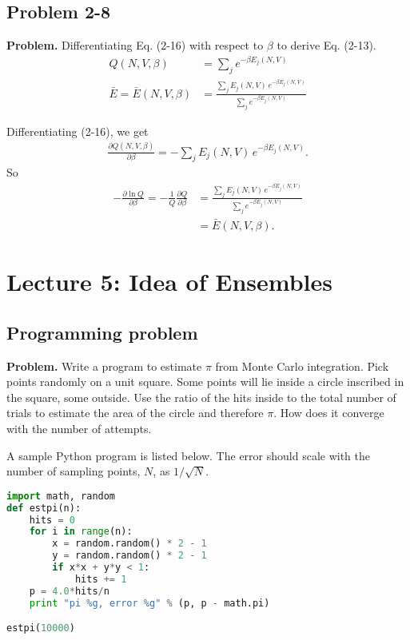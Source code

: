 \documentclass[twocolumn, 10pt]{article}
\numberwithin{equation}{section}
\newenvironment{problem}
{\par\medskip \color{problue}
  \textbf{Problem. }\ignorespaces}
{\medskip}
\newenvironment{solution}[1][\empty]
{\par\medskip\sffamily
  \textbf{\ifx\empty#1{Solution.}\relax\else{#1}\fi} \ignorespaces}
{\medskip}
\begin{document}
\subsection{Problem 2-8}

\begin{problem}
  Differentiating Eq. (2-16) with respect to $\beta$
  to derive Eq. (2-13).
  \begin{align}
    Q(N, V, \beta)
    &= \sum_j e^{-\beta E_j(N, V)}
    \tag{2-16}
    \\
    \bar E = \bar E(N, V, \beta)
    &=
    \frac{ \sum_j E_j(N, V) \, e^{-\beta E_j(N, V)} }
         { \sum_j e^{-\beta E_j(N, V) } }
    \tag{2-13}
  \end{align}
\end{problem}

\begin{solution}
Differentiating (2-16), we get
\begin{align*}
  \frac{ \partial Q(N, V, \beta) } { \partial \beta }
  = -\sum_j E_j(N, V) \, e^{-\beta E_j(N, V)}.
\end{align*}
So
\begin{align*}
  -\frac{ \partial \ln Q } { \partial \beta }
  =
  -\frac{1}{Q}
  \frac{ \partial Q } { \partial \beta }
  &=
  \frac{ \sum_j E_j(N, V) \, e^{-\beta E_j(N, V)} }
       { \sum_j e^{-\beta E_j(N, V)} }
  \\
  &=\bar E(N, V, \beta)
  .
\end{align*}
\end{solution}


\section{Lecture 5: Idea of Ensembles}

\subsection{Programming problem}

\begin{problem}
Write a program to estimate $\pi$ from Monte Carlo integration.
%
Pick points randomly on a unit square.
%
Some points will lie inside a circle inscribed in the square,
some outside.
%
Use the ratio of the hits inside to the total number of trials
to estimate the area of the circle and therefore $\pi$.
%
How does it converge with the number of attempts.
\end{problem}

\begin{solution}
A sample Python program is listed below.
The error should scale
with the number of sampling points, $N$,
as $1/\sqrt N$.

\begin{lstlisting}[language=Python]
import math, random
def estpi(n):
    hits = 0
    for i in range(n):
        x = random.random() * 2 - 1
        y = random.random() * 2 - 1
        if x*x + y*y < 1:
            hits += 1
    p = 4.0*hits/n
    print "pi %g, error %g" % (p, p - math.pi)

estpi(10000)
\end{lstlisting}
\end{solution}
\end{document}
